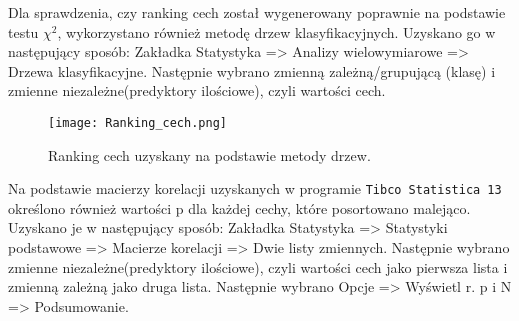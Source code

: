 \documentclass{article}
\begin{document}
Dla sprawdzenia, czy ranking cech został wygenerowany poprawnie na podstawie testu $\chi^2$, wykorzystano również metodę drzew klasyfikacyjnych. Uzyskano go w następujący sposób: Zakładka Statystyka => Analizy wielowymiarowe => Drzewa klasyfikacyjne. Następnie wybrano zmienną zależną/grupującą (klasę) i zmienne niezależne(predyktory ilościowe), czyli wartości cech.\\ 

\begin{figure}[ht]
    \centering
    \noindent 
    \vspace{.2cm}
    \texttt{[image: Ranking\_cech.png]}
    \caption{Ranking cech uzyskany na podstawie metody drzew.}
    \label{fig:ranking}
\end{figure}
\newpage
Na podstawie macierzy korelacji uzyskanych w programie \texttt{Tibco Statistica 13} określono również wartości p dla każdej cechy, które posortowano malejąco. Uzyskano je w następujący sposób: Zakładka Statystyka => Statystyki podstawowe => Macierze korelacji => Dwie listy zmiennych. Następnie wybrano zmienne niezależne(predyktory ilościowe), czyli wartości cech jako pierwsza lista i zmienną zależną jako druga lista. Następnie wybrano Opcje => Wyświetl r. p i N => Podsumowanie.\\ 
\end{document}
